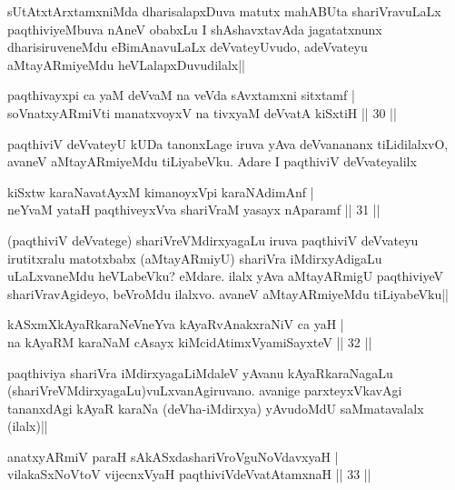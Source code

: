 \begin{artha}
sUtAtxtArxtamxniMda dharisalapxDuva matutx mahABUta shariVravuLaLx paqthiviyeMbuva nAneV obabxLu I shAshavxtavAda jagatatxnunx dharisiruveneMdu eBimAnavuLaLx deVvateyUvudo, adeVvateyu aMtayARmiyeMdu heVLalapxDuvudilalx||
\end{artha}

\begin{shl}
paqthivayxpi ca yaM deVvaM na veVda sAvxtamxni sitxtamf |\\
soV\s natxyARmiVti manatxvoyxV na tivxyaM deVvatA kiSxtiH \hfill || 30 ||
\end{shl}

\begin{artha}
paqthiviV deVvateyU kUDa tanonxLage iruva yAva deVvanananx tiLidilalxvO, avaneV aMtayARmiyeMdu tiLiyabeVku. Adare I paqthiviV deVvateyalilx 
\end{artha}


\begin{shl}
kiSxtw karaNavatAyxM kimanoyxV\s pi karaNAdimAnf |\\
neYvaM yataH paqthiveyxVva shariVraM yasayx nAparamf \hfill || 31 ||
\end{shl}

\begin{artha}
(paqthiviV deVvatege) shariVreVMdirxyagaLu iruva paqthiviV deVvateyu irutitxralu matotxbabx (aMtayARmiyU) shariVra iMdirxyAdigaLu uLaLxvaneMdu heVLabeVku? eMdare. ilalx yAva aMtayARmigU paqthiviyeV shariVravAgideyo, beVroMdu ilalxvo. avaneV aMtayARmiyeMdu tiLiyabeVku||
\end{artha}

\begin{shl}
kASxmXkAyaRkaraNeVneYva kAyaRvAnakxraNiV ca yaH |\\
na kAyaRM karaNaM cAsayx kiMcidAtimxVyamiSayxteV \hfill || 32 ||
\end{shl}

\begin{artha}
paqthiviya shariVra iMdirxyagaLiMdaleV yAvanu kAyaRkaraNagaLu (shariVreVMdirxyagaLu)vuLxvanAgiruvano. avanige parxteyxVkavAgi tananxdAgi kAyaR karaNa (deVha-iMdirxya) yAvudoMdU saMmatavalalx (ilalx)||
\end{artha}


\begin{shl}
anatxyARmiV paraH sAkASxdashariVroV\s guNoV\s davxyaH |\\
vilakaSxNoV\s toV vijecnxVyaH paqthiviVdeVvatAtamxnaH \hfill || 33 ||
\end{shl}

